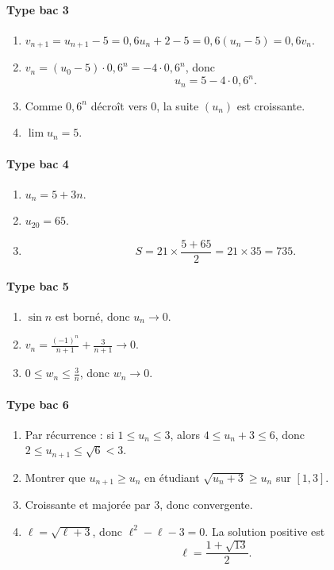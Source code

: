 \documentclass[11pt,a4paper]{article}
\theoremstyle{definition}
\begin{document}
\paragraph{Type bac 3}
\begin{enumerate}[label=\arabic*.]
    \item $v_{n+1}=u_{n+1}-5=0{,}6u_n+2-5=0{,}6(u_n-5)=0{,}6v_n$.
    \item $v_n=(u_0-5)\cdot 0{,}6^n=-4\cdot 0{,}6^n$, donc
    \[
    u_n=5-4\cdot 0{,}6^n.
    \]
    \item Comme $0{,}6^n$ décroît vers $0$, la suite $(u_n)$ est croissante.
    \item $\lim u_n=5$.
\end{enumerate}

\paragraph{Type bac 4}
\begin{enumerate}[label=\arabic*.]
    \item $u_n=5+3n$.
    \item $u_{20}=65$.
    \item
    \[
    S=21\times \frac{5+65}{2}=21\times 35=735.
    \]
\end{enumerate}

\paragraph{Type bac 5}
\begin{enumerate}[label=\alph*)]
    \item $\sin n$ est borné, donc $u_n\to0$.
    \item $v_n=\frac{(-1)^n}{n+1}+\frac{3}{n+1}\to0$.
    \item $0\le w_n\le \frac3n$, donc $w_n\to0$.
\end{enumerate}

\paragraph{Type bac 6}
\begin{enumerate}[label=\arabic*.]
    \item Par récurrence : si $1\le u_n\le3$, alors $4\le u_n+3\le6$, donc $2\le u_{n+1}\le \sqrt6<3$.
    \item Montrer que $u_{n+1}\ge u_n$ en étudiant $\sqrt{u_n+3}\ge u_n$ sur $[1,3]$.
    \item Croissante et majorée par $3$, donc convergente.
    \item $\ell=\sqrt{\ell+3}$, donc $\ell^2-\ell-3=0$. La solution positive est
    \[
    \ell=\frac{1+\sqrt{13}}{2}.
    \]
\end{enumerate}
\end{document}
